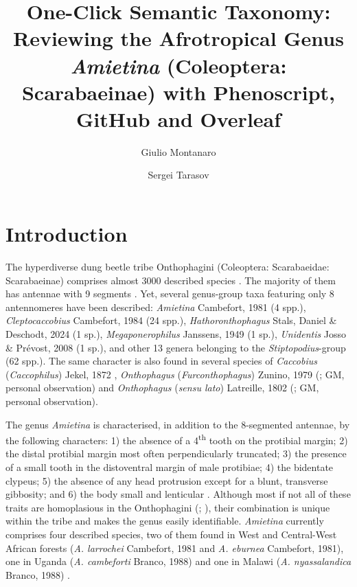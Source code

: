 \documentclass[fleqn,10pt,lineno]{wlpeerj}
\title{One-Click Semantic Taxonomy: Reviewing the Afrotropical Genus \textit{Amietina} (Coleoptera: Scarabaeinae) with Phenoscript, GitHub and Overleaf}
\author[1,2]{Giulio Montanaro}
\author[1]{Sergei Tarasov}
\affil[1]{Finnish Museum of Natural History, Pohjoinen Rautatiekatu 13, FI-00014 Helsinki, Finland}
\affil[2]{Association Catharsius, Paris, France}
\begin{document}
\flushbottom
\maketitle
\thispagestyle{empty}

\section*{Introduction}

The hyperdiverse dung beetle tribe Onthophagini (Coleoptera: Scarabaeidae: Scarabaeinae) comprises almost 3000 described species \citep{schoolmeesters2021scarabs}. The majority of them has antennae with 9 segments \citep{cambefort1981amietina}. Yet, several genus-group taxa featuring only 8 antennomeres have been described: \textit{Amietina} Cambefort, 1981 (4 spp.), \textit{Cleptocaccobius} Cambefort, 1984 (24 spp.), \textit{Hathoronthophagus} Stals, Daniel \& Deschodt, 2024 (1 sp.), \textit{Megaponerophilus} Janssens, 1949 (1 sp.), \textit{Unidentis} Josso \& Prévost, 2008 (1 sp.), and other 13 genera belonging to the \textit{Stiptopodius}-group \citep{branco1989etude, branco1992essai, schoolmeesters2021scarabs} (62 spp.). The same character is also found in several species of \textit{Caccobius} (\textit{Caccophilus}) Jekel, 1872 \citep{cambefort1979donnees}, \textit{Onthophagus} (\textit{Furconthophagus}) Zunino, 1979 (\citealp{cambefort1986une}; GM, personal observation) and \textit{Onthophagus} (\textit{sensu lato}) Latreille, 1802 (\citealp{cambefort1981amietina}; GM, personal observation). 

The genus \textit{Amietina} is characterised, in addition to the 8-segmented antennae, by the following characters: 1) the absence of a 4\textsuperscript{th} tooth on the protibial margin; 2) the distal protibial margin most often perpendicularly truncated; 3) the presence of a small tooth in the distoventral margin of male protibiae; 4) the bidentate clypeus; 5) the absence of any head protrusion except for a blunt, transverse gibbosity; and 6) the body small and lenticular \citep{branco1988deux, cambefort1981amietina}. Although most if not all of these traits are homoplasious in the Onthophagini (\citealp{philips2016phylogeny}; \citealp{tarasov2011phylogenetic}), their combination is unique within the tribe and makes the genus easily identifiable. \textit{Amietina} currently comprises four described species, two of them found in West and Central-West African forests (\textit{A. larrochei} Cambefort, 1981 and \textit{A. eburnea} Cambefort, 1981), one in Uganda (\textit{A. cambeforti} Branco, 1988) and one in Malawi (\textit{A. nyassalandica} Branco, 1988) \citep{branco1988deux, cambefort1981amietina}.
\end{document}

